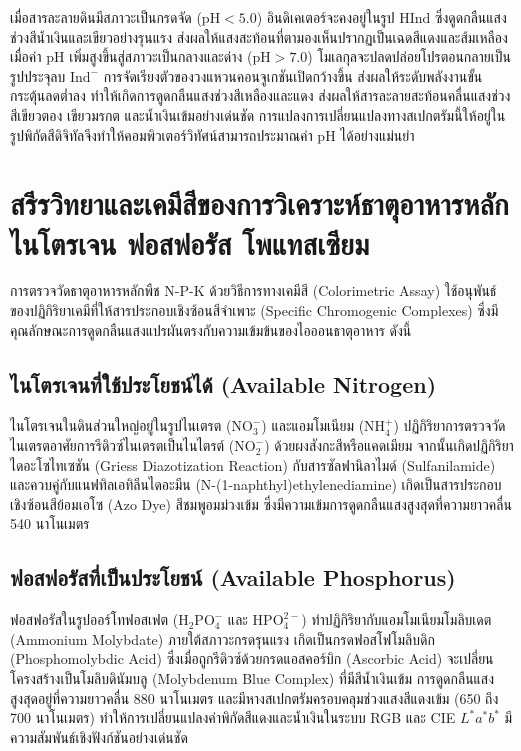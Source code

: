 เมื่อสารละลายดินมีสภาวะเป็นกรดจัด ($\text{pH} < 5.0$) อินดิเคเตอร์จะคงอยู่ในรูป $\text{H}\text{Ind}$ ซึ่งดูดกลืนแสงช่วงสีน้ำเงินและเขียวอย่างรุนแรง ส่งผลให้แสงสะท้อนที่ตามองเห็นปรากฏเป็นเฉดสีแดงและส้มเหลือง เมื่อค่า $\text{pH}$ เพิ่มสูงขึ้นสู่สภาวะเป็นกลางและด่าง ($\text{pH} > 7.0$) โมเลกุลจะปลดปล่อยโปรตอนกลายเป็นรูปประจุลบ $\text{Ind}^-$ การจัดเรียงตัวของวงแหวนคอนจูเกชันเปิดกว้างขึ้น ส่งผลให้ระดับพลังงานขั้นกระตุ้นลดต่ำลง ทำให้เกิดการดูดกลืนแสงช่วงสีเหลืองและแดง ส่งผลให้สารละลายสะท้อนคลื่นแสงช่วงสีเขียวตอง เขียวมรกต และน้ำเงินเข้มอย่างเด่นชัด การแปลงการเปลี่ยนแปลงทางสเปกตรัมนี้ให้อยู่ในรูปพิกัดสีดิจิทัลจึงทำให้คอมพิวเตอร์วิทัศน์สามารถประมาณค่า $\text{pH}$ ได้อย่างแม่นยำ

\section{สรีรวิทยาและเคมีสีของการวิเคราะห์ธาตุอาหารหลัก ไนโตรเจน ฟอสฟอรัส โพแทสเซียม}

การตรวจวัดธาตุอาหารหลักพืช N-P-K ด้วยวิธีการทางเคมีสี (Colorimetric Assay) ใช้อนุพันธ์ของปฏิกิริยาเคมีที่ให้สารประกอบเชิงซ้อนสีจำเพาะ (Specific Chromogenic Complexes) ซึ่งมีคุณลักษณะการดูดกลืนแสงแปรผันตรงกับความเข้มข้นของไอออนธาตุอาหาร ดังนี้

\subsection{ไนโตรเจนที่ใช้ประโยชน์ได้ (Available Nitrogen)}
ไนโตรเจนในดินส่วนใหญ่อยู่ในรูปไนเตรต ($\text{NO}_3^-$) และแอมโมเนียม ($\text{NH}_4^+$) ปฏิกิริยาการตรวจวัดไนเตรตอาศัยการรีดิวซ์ไนเตรตเป็นไนไตรต์ ($\text{NO}_2^-$) ด้วยผงสังกะสีหรือแคดเมียม จากนั้นเกิดปฏิกิริยาไดอะโซไทเซชัน (Griess Diazotization Reaction) กับสารซัลฟานิลาไมด์ (Sulfanilamide) และควบคู่กับแนฟทิลเอทิลีนไดอะมีน (N-(1-naphthyl)ethylenediamine) เกิดเป็นสารประกอบเชิงซ้อนสีย้อมเอโซ (Azo Dye) สีชมพูอมม่วงเข้ม ซึ่งมีความเข้มการดูดกลืนแสงสูงสุดที่ความยาวคลื่น 540 นาโนเมตร

\subsection{ฟอสฟอรัสที่เป็นประโยชน์ (Available Phosphorus)}
ฟอสฟอรัสในรูปออร์โทฟอสเฟต ($\text{H}_2\text{PO}_4^-$ และ $\text{HPO}_4^{2-}$) ทำปฏิกิริยากับแอมโมเนียมโมลิบเดต (Ammonium Molybdate) ภายใต้สภาวะกรดรุนแรง เกิดเป็นกรดฟอสโฟโมลิบดิก (Phosphomolybdic Acid) ซึ่งเมื่อถูกรีดิวซ์ด้วยกรดแอสคอร์บิก (Ascorbic Acid) จะเปลี่ยนโครงสร้างเป็นโมลิบดินัมบลู (Molybdenum Blue Complex) ที่มีสีน้ำเงินเข้ม การดูดกลืนแสงสูงสุดอยู่ที่ความยาวคลื่น 880 นาโนเมตร และมีหางสเปกตรัมครอบคลุมช่วงแสงสีแดงเข้ม (650 ถึง 700 นาโนเมตร) ทำให้การเปลี่ยนแปลงค่าพิกัดสีแดงและน้ำเงินในระบบ RGB และ CIE $L^*a^*b^*$ มีความสัมพันธ์เชิงฟังก์ชันอย่างเด่นชัด

